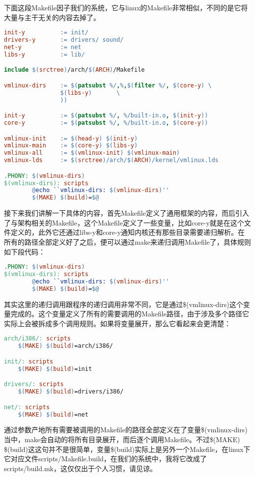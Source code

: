 下面这段Makefile因子我们的系统，它与linux的Makefile非常相似，不同的是它将大量与主干无关的内容去掉了。
\begin{lstlisting}[language=make]
init-y          := init/
drivers-y       := drivers/ sound/
net-y           := net
libs-y          := lib/

include $(srctree)/arch/$(ARCH)/Makefile

vmlinux-dirs    := $(patsubst %/,%,$(filter %/, $(core-y) \
                $(libs-y)       \
                ))

init-y          := $(patsubst %/, %/built-in.o, $(init-y))
core-y          := $(patsubst %/, %/built-in.o, $(core-y))

vmlinux-init    := $(head-y) $(init-y)
vmlinux-main    := $(core-y) $(libs-y)
vmlinux-all     := $(vmlinux-init) $(vmlinux-main)
vmlinux-lds     := $(srctree)/arch/$(ARCH)/kernel/vmlinux.lds

.PHONY: $(vmlinux-dirs)
$(vmlinux-dirs): scripts
        @echo ``vmlinux-dirs: $(vmlinux-dirs)''
        $(MAKE) $(build)=$@
\end{lstlisting}
接下来我们讲解一下具体的内容，首先Makefile定义了通用框架的内容，而后引入了与架构相关的Makefile，这个Makefile定义了一些变量，比如core-y就是在这个文件定义的，此外它还通过libs-y和core-y通知内核还有那些目录需要递归解析。在所有的路径全部定义好了之后，便可以通过make来递归调用Makefile了，具体规则如下段代码：
\begin{lstlisting}[language=make]
.PHONY: $(vmlinux-dirs)
$(vmlinux-dirs): scripts
        @echo ``vmlinux-dirs: $(vmlinux-dirs)''
        $(MAKE) $(build)=$@
\end{lstlisting}
其实这里的递归调用跟程序的递归调用非常不同，它是通过\$(vmlinux-dirs)这个变量完成的。这个变量定义了所有的需要调用的Makefile路径，由于涉及多个路径它实际上会被拆成多个调用规则。如果将变量展开，那么它看起来会更清楚：
\begin{lstlisting}[language=make]
arch/i386/: scripts
    $(MAKE) $(build)=arch/i386/

init/: scripts
    $(MAKE) $(build)=init

drivers/: scripts
    $(MAKE) $(build)=drivers/i386/

net/: scripts
    $(MAKE) $(build)=net

\end{lstlisting}
通过参数产地所有需要被调用的Makefile的路径全部定义在了变量\$(vmlinux-dirs)当中，make会自动的将所有目录展开，而后逐个调用Makefile。不过\$(MAKE) \$(build)这这句并不是很简单，变量\$(build)实际上是另外一个Makefile，在linux下它对应文件scripts/Makefile.build，在我们的系统中，我将它改成了scripts/build.mk，这仅仅出于个人习惯，请见谅。


